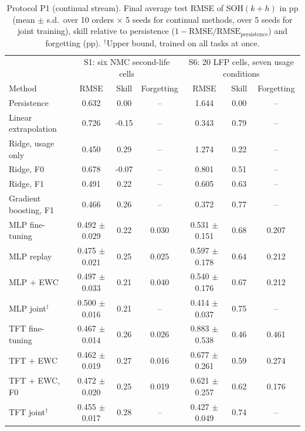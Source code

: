 \begin{table}[t]
  \centering
  \caption{Protocol P1 (continual stream). Final average test RMSE of SOH$(k{+}h)$ in pp (mean $\pm$ s.d.\ over 10 orders $\times$ 5 seeds for continual methods, over 5 seeds for joint training), skill relative to persistence ($1-\mathrm{RMSE}/\mathrm{RMSE}_{\mathrm{persistence}}$) and forgetting (pp). $^\dagger$Upper bound, trained on all tasks at once.}
  \label{tab:p1}
  \begin{tabular}{lccc|ccc}
    \toprule
    & \multicolumn{3}{c|}{S1: six NMC second-life cells} & \multicolumn{3}{c}{S6: 20 LFP cells, seven usage conditions} \\
    Method & RMSE & Skill & Forgetting & RMSE & Skill & Forgetting \\
    \midrule
    Persistence & 0.632 & 0.00 & -- & 1.644 & 0.00 & -- \\
    Linear extrapolation & 0.726 & -0.15 & -- & 0.343 & 0.79 & -- \\
    Ridge, usage only & 0.450 & 0.29 & -- & 1.274 & 0.22 & -- \\
    Ridge, F0 & 0.678 & -0.07 & -- & 0.801 & 0.51 & -- \\
    Ridge, F1 & 0.491 & 0.22 & -- & 0.605 & 0.63 & -- \\
    Gradient boosting, F1 & 0.466 & 0.26 & -- & 0.372 & 0.77 & -- \\
    \midrule
    MLP fine-tuning & 0.492 $\pm$ 0.029 & 0.22 & 0.030 & 0.531 $\pm$ 0.151 & 0.68 & 0.207 \\
    MLP replay & 0.475 $\pm$ 0.021 & 0.25 & 0.025 & 0.597 $\pm$ 0.178 & 0.64 & 0.212 \\
    MLP + EWC & 0.497 $\pm$ 0.033 & 0.21 & 0.040 & 0.540 $\pm$ 0.176 & 0.67 & 0.212 \\
    MLP joint$^\dagger$ & 0.500 $\pm$ 0.016 & 0.21 & -- & 0.414 $\pm$ 0.037 & 0.75 & -- \\
    \midrule
    TFT fine-tuning & 0.467 $\pm$ 0.014 & 0.26 & 0.026 & 0.883 $\pm$ 0.538 & 0.46 & 0.461 \\
    TFT + EWC & 0.462 $\pm$ 0.019 & 0.27 & 0.016 & 0.677 $\pm$ 0.261 & 0.59 & 0.274 \\
    TFT + EWC, F0 & 0.472 $\pm$ 0.020 & 0.25 & 0.019 & 0.621 $\pm$ 0.257 & 0.62 & 0.176 \\
    TFT joint$^\dagger$ & 0.455 $\pm$ 0.017 & 0.28 & -- & 0.427 $\pm$ 0.049 & 0.74 & -- \\
    \bottomrule
  \end{tabular}
\end{table}
